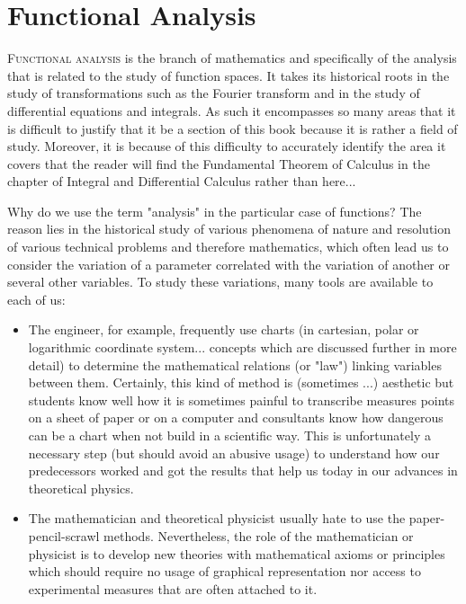 	\newpage
	\thispagestyle{empty}
	\mbox{} 
	\section{Functional Analysis}\label{functional analysis}
\lettrine[lines=4]{\color{BrickRed}F}{unctional analysis} is the branch of mathematics and specifically of the analysis that is related to the study of function spaces. It takes its historical roots in the study of transformations such as the Fourier transform and in the study of differential equations and integrals. As such it encompasses so many areas that it is difficult to justify that it be a section of this book because it is rather a field of study. Moreover, it is because of this difficulty to accurately identify the area it covers that the reader will find the Fundamental Theorem of Calculus in the chapter of Integral and Differential Calculus rather than here... 
	
	Why do we use the term "analysis" in the particular case of functions? The reason lies in the historical study of various phenomena of nature and resolution of various technical problems and therefore mathematics, which often lead us to consider the variation of a parameter correlated with the variation of another or several other variables. To study these variations, many tools are available to each of us:
	\begin{itemize}
		\item The engineer, for example, frequently use charts (in cartesian, polar or logarithmic coordinate system... concepts which are discussed further in more detail) to determine the mathematical relations (or "law") linking variables between them. Certainly, this kind of method is (sometimes ...) aesthetic but students know well how it is sometimes painful to transcribe measures points on a sheet of paper or on a computer and consultants know how dangerous can be a chart when not build in a scientific way. This is unfortunately a necessary step (but should avoid an abusive usage) to understand how our predecessors worked and got the results that help us today in our advances in theoretical physics.
		
		\item The mathematician and theoretical physicist usually hate to use the paper-pencil-scrawl methods. Nevertheless, the role of the mathematician or physicist is to develop new theories with mathematical axioms or principles which should require no usage of graphical representation nor access to experimental  measures that are often attached to it.
	\end{itemize}

